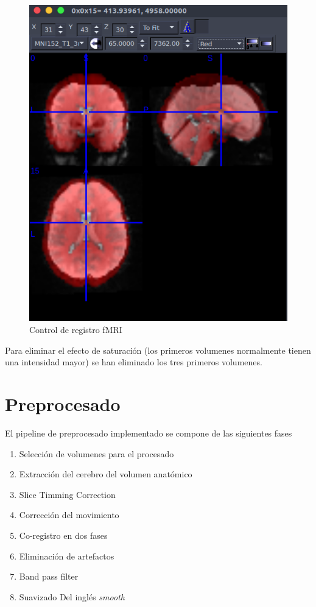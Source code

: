 \begin{figure}[H]
	\centering
	\includegraphics[scale=0.5]{img/overlay.png}
	\caption{Control de registro fMRI}
	\label{vis:overlap}
\end{figure}

Para eliminar el efecto de saturación (los primeros volumenes normalmente tienen una intensidad mayor) se han eliminado los tres primeros volumenes.

\newpage
\section{Preprocesado}

El pipeline de preprocesado implementado se compone de las siguientes fases

\begin{enumerate}
\item Selección de volumenes para el procesado
\item Extracción del cerebro del volumen anatómico
\item Slice Timming Correction
\item Corrección del movimiento 
\item Co-registro en dos fases
\item Eliminación de artefactos
\item Band pass filter
\item Suavizado Del inglés \textit{smooth}
\end{enumerate}

